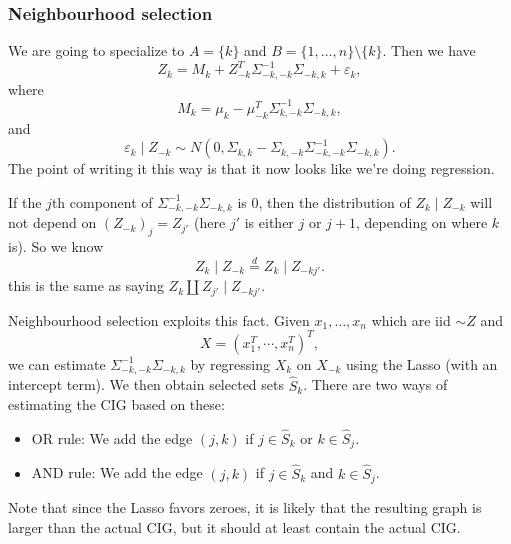 \documentclass[a4paper]{article}
\begin{document}
\subsubsection*{Neighbourhood selection}
We are going to specialize to $A = \{k\}$ and $B = \{1, \ldots, n\} \setminus \{k\}$. Then we have
\[
  Z_k = M_k + Z_{-k}^T \Sigma_{-k, -k}^{-1} \Sigma_{-k, k} + \varepsilon_k,
\]
where
\[
  M_k = \mu_k - \mu_{-k}^T \Sigma_{k, -k}^{-1} \Sigma_{-k, k},
\]
and
\[
  \varepsilon_k \mid Z_{-k} \sim N(0, \Sigma_{k, k} - \Sigma_{k, -k} \Sigma_{-k, -k}^{-1} \Sigma_{-k, k}).
\]
The point of writing it this way is that it now looks like we're doing regression.

If the $j$th component of $\Sigma_{-k, -k}^{-1} \Sigma_{-k, k}$ is $0$, then the distribution of $Z_k \mid Z_{-k}$ will not depend on $(Z_{-k})_j = Z_{j'}$ (here $j'$ is either $j$ or $j + 1$, depending on where $k$ is). So we know
\[
  Z_k \mid Z_{-k} \overset{d}{=} Z_k \mid Z_{-kj'}.
\]
this is the same as saying $Z_k \amalg Z_{j'} \mid Z_{-kj'}$.

Neighbourhood selection exploits this fact. Given $x_1, \ldots, x_n$ which are iid $\sim Z$ and
\[
  X = (x_1^T, \cdots, x_n^T)^T,
\]
we can estimate $\Sigma_{-k, -k}^{-1} \Sigma_{-k, k}$ by regressing $X_k$ on $X_{-k}$ using the Lasso (with an intercept term). We then obtain selected sets $\hat{S}_k$. There are two ways of estimating the CIG based on these:
\begin{itemize}
  \item OR rule: We add the edge $(j, k)$ if $j \in \hat{S}_k$ or $k \in \hat{S}_j$.
  \item AND rule: We add the edge $(j, k)$ if $j \in \hat{S}_k$ and $k \in \hat{S}_j$.
\end{itemize}
Note that since the Lasso favors zeroes, it is likely that the resulting graph is larger than the actual CIG, but it should at least contain the actual CIG.
\end{document}
